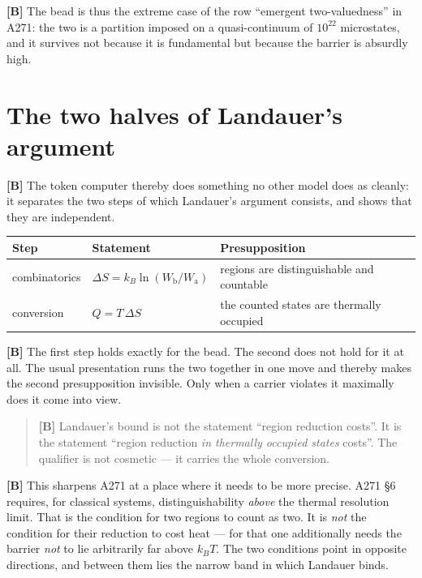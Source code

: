 \textbf{[B]} The bead is thus the extreme case of the row “emergent two-valuedness” in
A271: the two is a partition imposed on a quasi-continuum of $10^{22}$
microstates, and it survives not because it is fundamental but because the barrier
is absurdly high.

\section{The two halves of Landauer's argument}
\label{sec:twohalves}

\textbf{[B]} The token computer thereby does something no other model does as cleanly: it
separates the two steps of which Landauer's argument consists, and shows that they
are independent.

\begin{center}
\small
\begin{tabular}{@{}p{}p{}p{}@{}}
\toprule
\textbf{Step} & \textbf{Statement} & \textbf{Presupposition} \\
\midrule
combinatorics & $\Delta S = k_B \ln(W_{\text{b}}/W_{\text{a}})$ &
regions are distinguishable and countable \\
conversion & $Q = T\,\Delta S$ &
the counted states are thermally occupied \\
\bottomrule
\end{tabular}
\end{center}

\textbf{[B]} The first step holds exactly for the bead. The second does not hold for it at
all. The usual presentation runs the two together in one move and thereby makes
the second presupposition invisible. Only when a carrier violates it maximally
does it come into view.

\begin{quote}
\textbf{[B]} Landauer's bound is not the statement “region reduction costs”. It is the
statement “region reduction \emph{in thermally occupied states} costs”. The
qualifier is not cosmetic --- it carries the whole conversion.
\end{quote}

\textbf{[B]} This sharpens A271 at a place where it needs to be more precise. A271 §6
requires, for classical systems, distinguishability \emph{above} the thermal
resolution limit. That is the condition for two regions to count as two. It is
\emph{not} the condition for their reduction to cost heat --- for that one
additionally needs the barrier \emph{not} to lie arbitrarily far above $k_BT$.
The two conditions point in opposite directions, and between them lies the narrow
band in which Landauer binds.

